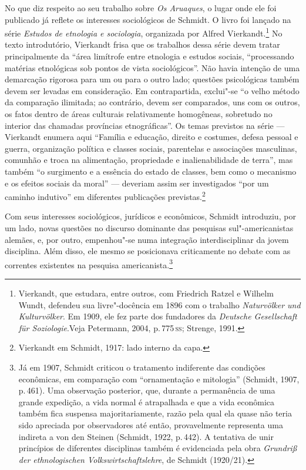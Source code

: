 No que diz respeito ao seu trabalho sobre \textit{Os Aruaques}, o lugar onde
ele foi publicado já reflete os interesses sociológicos de Schmidt. O
livro foi lançado na série \textit{Estudos de etnologia e sociologia}, organizada por
Alfred Vierkandt.\footnote{Vierkandt, que estudara, entre
  outros, com Friedrich Ratzel e Wilhelm Wundt, defendeu sua
  livre"-docência em 1896 com o trabalho \textit{Naturvölker und
  Kulturvölker}. Em 1909, ele
  fez parte dos fundadores da \textit{Deutsche Gesellschaft für
  Soziologie}.Veja Petermann, 2004, p.\,775\,\textsc{ss}; Strenge, 1991.} No texto introdutório, Vierkandt frisa que os
trabalhos dessa série devem tratar principalmente da ``área limítrofe
entre etnologia e estudos sociais,
``processando matérias etnológicas sob pontos de vista sociológicos''.
Não havia intenção de uma demarcação rigorosa para um ou para o outro
lado; questões psicológicas também devem ser levadas em consideração. Em
contrapartida, exclui"-se ``o velho método da comparação ilimitada; ao
contrário, devem ser comparados, uns com os outros, os fatos dentro de
áreas culturais relativamente homogêneas, sobretudo no interior das
chamadas províncias etnográficas''. Os temas previstos na série ---
Vierkandt enumera aqui ``Família e educação, direito e costumes, defesa
pessoal e guerra, organização política e classes sociais, parentelas e associações masculinas, comunhão e troca na
alimentação, propriedade e inalienabilidade de terra'', mas também ``o surgimento e a essência do estado de classes, bem como o mecanismo e os efeitos sociais da moral''
--- deveriam assim ser investigados ``por um caminho indutivo'' em
diferentes publicações previstas.\footnote{Vierkandt em Schmidt, 1917:
  lado interno da capa.}


Com seus interesses sociológicos, jurídicos e econômicos, Schmidt
introduziu, por um lado, novas questões no discurso dominante das
pesquisas sul"-americanistas alemães, e, por outro, empenhou"-se numa
integração interdisciplinar da jovem disciplina. Além disso, ele mesmo
se posicionava criticamente no debate com as correntes existentes na
pesquisa americanista.\footnote{Já em 1907, Schmidt criticou o
  tratamento indiferente das condições econômicas, em comparação com
  ``ornamentação e mitologia'' (Schmidt, 1907, p.\,461). Uma observação
  posterior, que, durante a permanência de uma grande expedição, a vida
  normal é atrapalhada e que a vida econômica também fica suspensa
  majoritariamente, razão pela qual ela quase não teria sido apreciada
  por observadores até então, provavelmente representa uma indireta a
  von den Steinen (Schmidt, 1922, p.\,442). A tentativa de unir
  princípios de diferentes disciplinas também é evidenciada pela obra
  \textit{Grundriß der ethnologischen Volkswirtschaftslehre}, de Schmidt (1920/21).}

